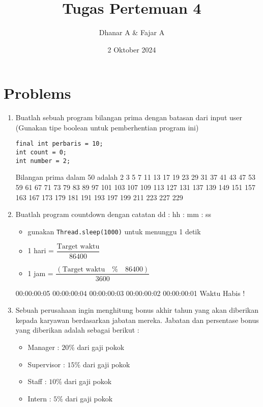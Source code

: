 \documentclass{article}
\title{\textbf{Tugas Pertemuan 4}}
\date{2 Oktober 2024}
\author{Dhanar A \& Fajar A}
\begin{document}
\maketitle

\section*{Problems}
\begin{enumerate}
    
    \item Buatlah sebuah program bilangan prima dengan batasan dari input user (Gunakan tipe boolean untuk pemberhentian program ini) 

    \begin{hint}
\begin{lstlisting}[style=standard]
final int perbaris = 10;
int count = 0;
int number = 2;
    \end{lstlisting}
    \end{hint}

\begin{RunCode}
Bilangan prima dalam 50 adalah 
2 3 5 7 11 13 17 19 23 29
31 37 41 43 47 53 59 61 67 71
73 79 83 89 97 101 103 107 109 113
127 131 137 139 149 151 157 163 167 173
179 181 191 193 197 199 211 223 227 229
\end{RunCode}
    \newpage
    
    \item Buatlah program countdown dengan catatan dd : hh : mm : ss 
    \begin{hint}
        \begin{itemize}
            \item gunakan \texttt{Thread.sleep(1000)} untuk menunggu 1 detik
            \item 1 hari = $\dfrac{\text{Target waktu}}{86400}$
            \item 1 jam = $\dfrac{(\text{Target waktu} \quad \texttt{\%} \quad 86400)}{3600} $
        \end{itemize}
    \end{hint}

    \begin{RunCode}
00:00:00:05
00:00:00:04
00:00:00:03
00:00:00:02
00:00:00:01
Waktu Habis !
    \end{RunCode}

    \newpage
    
    \item Sebuah perusahaan ingin menghitung bonus akhir tahun yang akan diberikan kepada karyawan berdasarkan jabatan mereka. Jabatan dan persentase bonus yang diberikan adalah sebagai berikut : 
    \begin{itemize}
        \item Manager : $20\%$ dari gaji pokok
        \item Supervisor : $15\%$ dari gaji pokok
        \item Staff : $10\%$ dari gaji pokok
        \item Intern : $5\%$ dari gaji pokok
    \end{itemize}


\end{enumerate}
\end{document}
